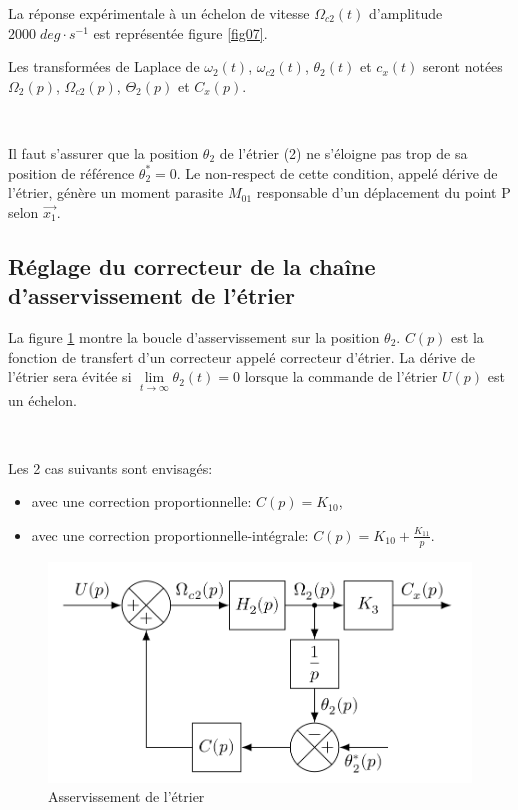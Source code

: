 La réponse expérimentale à un échelon de vitesse $\Omega_{c2}(t)$ d'amplitude $2000\;deg\cdot s^{-1}$ est représentée figure \ref{fig07}.

Les transformées de Laplace de $\omega_2(t)$,  $\omega_{c2}(t)$,  $\theta_2(t)$ et $c_x(t)$ seront notées $\Omega_2(p)$, $\Omega_{c2}(p)$, $\Theta_2(p)$ et $C_x(p)$.


~\

Il faut s'assurer que la position $\theta_2$ de l'étrier (2) ne s'éloigne pas trop de sa position de référence $\theta_2^*=0$. Le non-respect de cette condition, appelé dérive de l'étrier, génère un moment parasite $M_{01}$ responsable d'un déplacement du point P selon $\overrightarrow{x_1}$.

\subsection{Réglage du correcteur de la chaîne d'asservissement de l'étrier}

La figure \ref{fig08} montre la boucle d'asservissement sur la position $\theta_2$. $C(p)$ est la fonction de transfert d'un correcteur appelé correcteur d'étrier. La dérive de l'étrier sera évitée si $\lim\limits_{t \to \infty }\theta_2(t)=0$ lorsque la commande de l'étrier $U(p)$ est un échelon.

~\

Les 2 cas suivants sont envisagés:
\begin{itemize}
 \item avec une correction proportionnelle: $C(p)=K_{10}$,
 \item avec une correction proportionnelle-intégrale: $C(p)=K_{10}+\frac{K_{11}}{p}$.
\end{itemize}

\begin{figure}[ht]
\begin{center}
\includegraphics[width=0.5\linewidth]{img/fig08}
\caption{Asservissement de l'étrier}
\label{fig08}
\end{center}
\end{figure}

